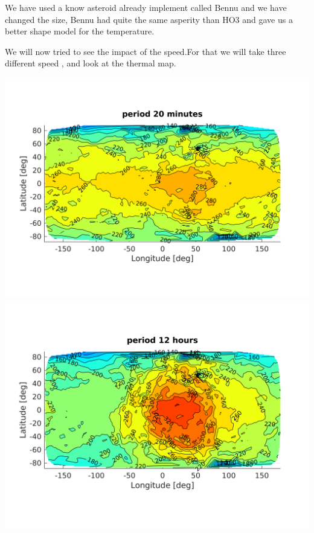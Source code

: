 We have used a know asteroid already implement called Bennu and we have changed the size, Bennu had quite the same asperity than HO3 and gave us a better shape model for the temperature.



We will now tried to see the impact of the speed.For that we will take three different speed , and look at the thermal map.\\[10pt]


\begin{center} %
    \includegraphics[width=\linewidth]{rsc/theo20mn.png}
    \includegraphics[width=\linewidth]{rsc/theo12h.png}
\end{center}



